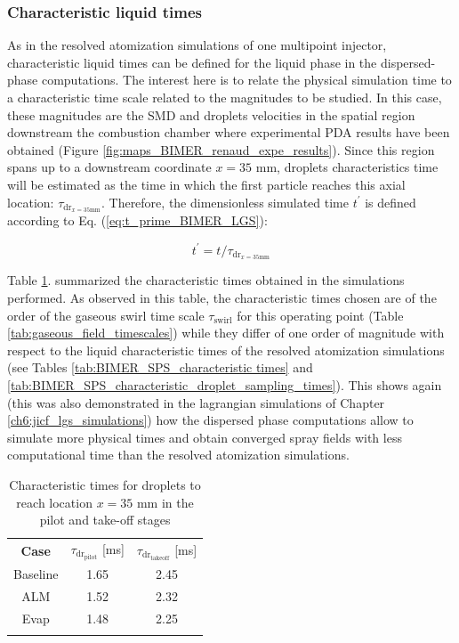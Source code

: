 \subsubsection*{Characteristic liquid times}

As in the resolved atomization simulations of one multipoint injector, characteristic liquid times can be defined for the liquid phase in the dispersed-phase computations. The interest here is to relate the physical simulation time to a characteristic time scale related to the magnitudes to be studied. In this case, these magnitudes are the SMD and droplets velocities in the spatial region downstream the combustion chamber where experimental PDA results have been obtained (Figure \ref{fig:maps_BIMER_renaud_expe_results}). Since this region spans up to a downstream coordinate $x = 35$ mm, droplets characteristics time will be estimated as the time in which the first particle reaches this axial location: $\tau_{\mathrm{dr}_{x=35\mathrm{mm}}}$. Therefore, the dimensionless simulated time $t^{\prime}$ is defined according to Eq. (\ref{eq:t_prime_BIMER_LGS}):

\begin{equation}
\label{eq:t_prime_BIMER_LGS}
t^{\prime} = t / \tau_{\mathrm{dr}_{x=35\mathrm{mm}}}
\end{equation}


Table \ref{tab:BIMER_dispersed_phase_characteristic_times}.  summarized the characteristic times obtained in the simulations performed. As observed in this table, the characteristic times chosen are of the order of the gaseous swirl time scale $\tau_\mathrm{swirl}$ for this operating point (Table \ref{tab:gaseous_field_timescales}) while they differ of one order of magnitude with respect to the liquid characteristic times of the resolved atomization simulations (see Tables \ref{tab:BIMER_SPS_characteristic times} and \ref{tab:BIMER_SPS_characteristic_droplet_sampling_times}).  This shows again (this was also demonstrated in the lagrangian simulations of Chapter \ref{ch6:jicf_lgs_simulations}) how the dispersed phase computations allow to simulate more physical times and obtain converged spray fields with less computational time than the resolved atomization simulations. 


\begin{table}[!h]
\centering
\caption{Characteristic times for droplets to reach location $x = 35$ mm in the pilot and take-off stages }
\begin{tabular}{ccc}
\thickhline
\textbf{Case} & $\tau_{\mathrm{dr}_\mathrm{pilot}}$ [ms] & $\tau_{\mathrm{dr}_\mathrm{takeoff}}$ [ms] \\
\thickhline
Baseline & 1.65 & 2.45 \\  %
ALM & 1.52 & 2.32 \\ %
Evap & 1.48 & 2.25 \\ %
\thickhline
\end{tabular}
\label{tab:BIMER_dispersed_phase_characteristic_times}
\end{table}





